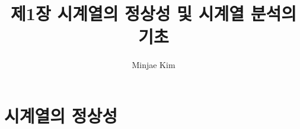 \documentclass{article}
\title{제1장 시계열의 정상성 및 시계열 분석의 기초}
\author{Minjae Kim}
\date{} %
\begin{document}
\doublespacing
\maketitle
\section{시계열의 정상성}
\end{document}
